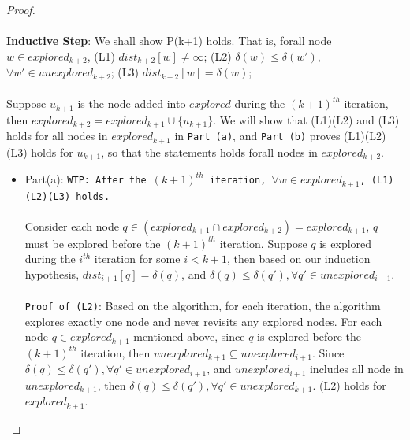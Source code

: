 \documentclass[11pt, oneside]{article}   	%
\theoremstyle{definition}
\begin{document}
\begin{proof}
\\\\
\textbf{Inductive Step}: We shall show P(k+1) holds. That is, forall node $w \in explored_{k+2}$, (L1) $dist_{k+2}[w] \neq \infty$; (L2) $\delta(w) \leq \delta(w')$, $\forall w' \in unexplored_{k+2}$; (L3) $dist_{k+2}[w] = \delta(w)$;
\\\\
Suppose $u_{k+1}$ is the node added into $explored$ during the $(k+1)^{th}$ iteration, then $explored_{k+2} = explored_{k+1} \cup \{u_{k+1}\}$. We will show that (L1)(L2) and (L3) holds for all nodes in $explored_{k+1}$ in \texttt{Part (a)}, and \texttt{Part (b)} proves (L1)(L2)(L3) holds for $u_{k+1}$, so that the statements holds forall nodes in $explored_{k+2}$. 
\begin{itemize}
  \item Part(a): \texttt{WTP: After the $(k+1)^{th}$ iteration, $\forall w \in explored_{k+1}$, (L1)(L2)(L3) holds.} 
  \\\\
  Consider each node $q \in (explored_{k+1} \cap explored_{k+2}) = explored_{k+1}$, $q$ must be explored before the $(k+1)^{th}$ iteration. Suppose $q$ is explored during the $i^{th}$ iteration for some $i < k+1$, then based on our induction hypothesis, $dist_{i+1}[q] = \delta(q)$, and $\delta(q) \leq \delta(q'), \forall q' \in unexplored_{i+1}$. 
  \\\\
  \texttt{Proof of (L2)}: Based on the algorithm, for each iteration, the algorithm explores exactly one node and never revisits any explored nodes. For each node $q \in explored_{k+1}$ mentioned above, since $q$ is explored before the $(k+1)^{th}$ iteration, then $unexplored_{k+1} \subseteq unexplored_{i+1}$. Since $\delta(q) \leq \delta(q'), \forall q' \in unexplored_{i+1}$, and $unexplored_{i+1}$ includes all node in $unexplored_{k+1}$, then $\delta(q) \leq \delta(q'), \forall q' \in unexplored_{k+1}$. (L2) holds for $explored_{k+1}$. 

\end{itemize}
\end{proof}
\end{document}
